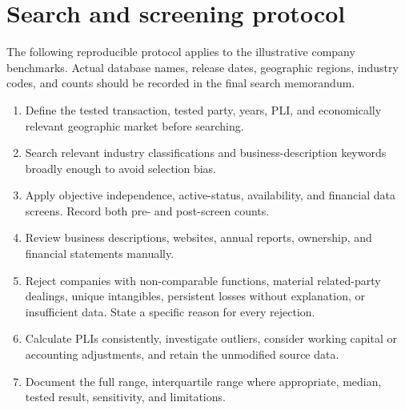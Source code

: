 \chapter{Search and screening protocol}
The following reproducible protocol applies to the illustrative company
benchmarks. Actual database names, release dates, geographic regions, industry
codes, and counts should be recorded in the final search memorandum.

\begin{enumerate}
  \item Define the tested transaction, tested party, years, PLI, and economically
    relevant geographic market before searching.
  \item Search relevant industry classifications and business-description
    keywords broadly enough to avoid selection bias.
  \item Apply objective independence, active-status, availability, and financial
    data screens. Record both pre- and post-screen counts.
  \item Review business descriptions, websites, annual reports, ownership, and
    financial statements manually.
  \item Reject companies with non-comparable functions, material related-party
    dealings, unique intangibles, persistent losses without explanation, or
    insufficient data. State a specific reason for every rejection.
  \item Calculate PLIs consistently, investigate outliers, consider working
    capital or accounting adjustments, and retain the unmodified source data.
  \item Document the full range, interquartile range where appropriate, median,
    tested result, sensitivity, and limitations.
\end{enumerate}
